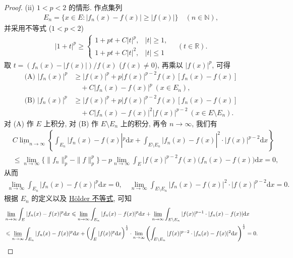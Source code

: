 \documentclass[../../main.tex]{subfiles}%
\begin{document}
\begin{proof}
(ii) $1<p<2$ 的情形. 作点集列
\begin{align*}
E_n=\{x\in E:|f_n(x)-f(x)|\geqslant|f(x)|\}\quad (n\in\mathbb{N}),
\end{align*}
并采用不等式 ($1<p<2$)
\begin{align}
|1+t|^p\geqslant
\begin{cases}
1+pt+C|t|^p, & |t|\geqslant 1, \\
1+pt+C|t|^2, & |t|\leqslant 1
\end{cases}
\quad (t\in\mathbb{R}). \label{eq:radon2}
\end{align}
取 $t=(f_n(x)-|f(x)|)/f(x)$ ($f(x)\neq 0$), 再乘以 $|f(x)|^p$, 可得
\begin{align*}
\text{(A) } |f_n(x)|^p &\geqslant |f(x)|^p + p|f(x)|^{p-2}f(x)[f_n(x)-f(x)] \\
&\quad + C|f_n(x)-f(x)|^p\ (x\in E_n), \\
\text{(B) } |f_n(x)|^p &\geqslant |f(x)|^p + p|f(x)|^{p-2}f(x)[f_n(x)-f(x)] \\
&\quad + C|f_n(x)-f(x)|^2|f(x)|^{p-2}\ (x\in E\setminus E_n).
\end{align*}
对 (A) 作 $E$ 上积分, 对 (B) 作 $E\setminus E_n$ 上的积分, 再令 $n\to\infty$, 我们有
\begin{align*}
&C\underline{\lim }_{n\rightarrow \infty}\left\{ \int_{E_n}{|f_n(x)}-f(x)|^p\mathrm{d}x+\int_{E\setminus E_n}{|f_n(x)}-f(x)|^2\cdot |f(x)|^{p-2}\mathrm{d}x \right\} 
\\
&\leqslant \lim_{n\rightarrow \infty} \{\parallel f_n\parallel _{p}^{p}-\parallel f\parallel _{p}^{p}\}-p\lim_{n\rightarrow \infty} \int_E{|f(x)|^{p-2}f(x)(f_n(x)}-f(x))\mathrm{d}x=0,
\end{align*}
从而
\begin{align*}
\lim_{n\to\infty}\int_{E_n}|f_n(x)-f(x)|^p\mathrm{d}x=0, \quad
\lim_{n\to\infty}\int_{E\setminus E_n}|f_n(x)-f(x)|^2\cdot|f(x)|^{p-2}\mathrm{d}x=0.
\end{align*}
根据 $E_n$ 的定义以及 \hyperref[theorem:实变函数--Hölder不等式]{Hölder 不等式}, 可知
\begin{align*}
&\varliminf_{n\to\infty}\int_E |f_n(x)-f(x)|^p\mathrm{d}x
\leqslant \varliminf_{n\to\infty}\int_{E_n}|f_n(x)-f(x)|^p\mathrm{d}x + \varliminf_{n\to\infty}\int_{E\setminus E_n}|f(x)|^{p-1}\cdot|f_n(x)-f(x)|\mathrm{d}x \\
&\leqslant \varliminf_{n\to\infty}\int_{E_n}|f_n(x)-f(x)|^p\mathrm{d}x + \left(\int_E |f(x)|^p\mathrm{d}x\right)^{\frac{1}{2}}\cdot\lim_{n\to\infty}\left(\int_{E\setminus E_n}|f(x)|^{p-2}\cdot|f_n(x)-f(x)|^2\mathrm{d}x\right)^{\frac{1}{2}}=0.
\end{align*}
\end{proof}
\end{document}
